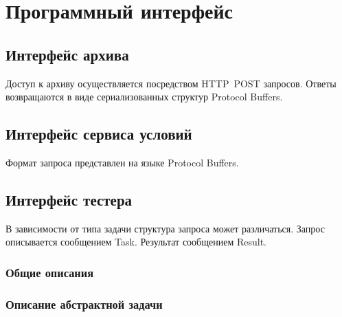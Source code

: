 \chapter{Программный интерфейс}

\section{Интерфейс архива}
Доступ к архиву осуществляется посредством HTTP~POST запросов.
Ответы возвращаются в виде сериализованных структур Protocol Buffers.



\section{Интерфейс сервиса условий}
Формат запроса представлен на языке Protocol Buffers.


\section{Интерфейс тестера}
В зависимости от типа задачи структура запроса может различаться.
Запрос описывается сообщением Task. Результат сообщением Result.

\subsection{Общие описания}




\subsection{Описание абстрактной задачи}


